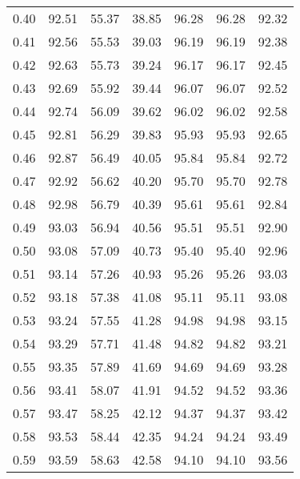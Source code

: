 \begin{tabular}{|c|c|c|c|c|c|c|}
      0.40 &     92.51 &     55.37 &      38.85 &   96.28 &      96.28 &         92.32 \\
      0.41 &     92.56 &     55.53 &      39.03 &   96.19 &      96.19 &         92.38 \\
      0.42 &     92.63 &     55.73 &      39.24 &   96.17 &      96.17 &         92.45 \\
      0.43 &     92.69 &     55.92 &      39.44 &   96.07 &      96.07 &         92.52 \\
      0.44 &     92.74 &     56.09 &      39.62 &   96.02 &      96.02 &         92.58 \\
      0.45 &     92.81 &     56.29 &      39.83 &   95.93 &      95.93 &         92.65 \\
      0.46 &     92.87 &     56.49 &      40.05 &   95.84 &      95.84 &         92.72 \\
      0.47 &     92.92 &     56.62 &      40.20 &   95.70 &      95.70 &         92.78 \\
      0.48 &     92.98 &     56.79 &      40.39 &   95.61 &      95.61 &         92.84 \\
      0.49 &     93.03 &     56.94 &      40.56 &   95.51 &      95.51 &         92.90 \\
      0.50 &     93.08 &     57.09 &      40.73 &   95.40 &      95.40 &         92.96 \\
      0.51 &     93.14 &     57.26 &      40.93 &   95.26 &      95.26 &         93.03 \\
      0.52 &     93.18 &     57.38 &      41.08 &   95.11 &      95.11 &         93.08 \\
      0.53 &     93.24 &     57.55 &      41.28 &   94.98 &      94.98 &         93.15 \\
      0.54 &     93.29 &     57.71 &      41.48 &   94.82 &      94.82 &         93.21 \\
      0.55 &     93.35 &     57.89 &      41.69 &   94.69 &      94.69 &         93.28 \\
      0.56 &     93.41 &     58.07 &      41.91 &   94.52 &      94.52 &         93.36 \\
      0.57 &     93.47 &     58.25 &      42.12 &   94.37 &      94.37 &         93.42 \\
      0.58 &     93.53 &     58.44 &      42.35 &   94.24 &      94.24 &         93.49 \\
      0.59 &     93.59 &     58.63 &      42.58 &   94.10 &      94.10 &         93.56 \\

\end{tabular}
